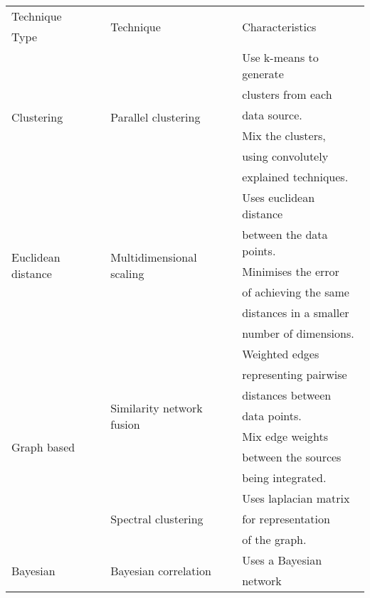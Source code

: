 \documentclass[11pt,a4paper,twoside,openright]{report}
\begin{document}
\begin{table}[hp]
\centering
\begin{tabular}{|l|l|l|}
\toprule
Technique & \multirow{2}{0.3\textwidth}{Technique}
          & \multirow{2}{0.39\textwidth}{Characteristics} \\
Type & & \\
\midrule

\multirow{6}{0.2\textwidth}{Clustering}
& \multirow{6}{0.3\textwidth}{Parallel clustering\cite{greene2008}}
  & Use k-means to generate \\
& & clusters from each \\
& & data source. \\
\cline{3-3}
& & Mix the clusters, \\
& & using convolutely \\
& & explained techniques. \\
\hline

\multirow{6}{0.2\textwidth}{Euclidean distance}
& \multirow{6}{0.3\textwidth}{Multidimensional scaling\cite{kruskal1978}}
  & Uses euclidean distance \\
& & between the data points. \\
\cline{3-3}
& & Minimises the error \\
& & of achieving the same \\
& & distances in a smaller \\
& & number of dimensions. \\
\hline

\multirow{10}{0.2\textwidth}{Graph based}
& \multirow{7}{0.3\textwidth}{Similarity network fusion\cite{wang2014}}
  & Weighted edges \\
& & representing pairwise \\
& & distances between \\
& & data points. \\
\cline{3-3}
& & Mix edge weights \\
& & between the sources \\
& & being integrated. \\
\cline{2-3}
& \multirow{3}{0.3\textwidth}{Spectral clustering\cite{luxburg2007}}
  & Uses laplacian matrix\\
& & for representation \\
& & of the graph. \\
\hline

\multirow{2}{0.2\textwidth}{Bayesian}
& \multirow{2}{0.3\textwidth}{Bayesian correlation\cite{kirk2012}}
  & Uses a Bayesian \\
& & network \\
\hline


\end{tabular}
\end{table}
\end{document}
